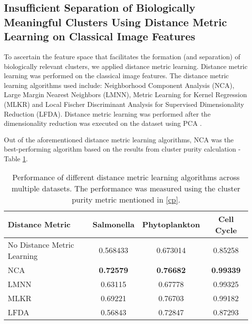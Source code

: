 \documentclass[12pt,a4paper]{article}
\begin{document}
\subsection{Insufficient Separation of Biologically Meaningful Clusters Using Distance Metric Learning on Classical Image Features}

To ascertain the feature space that facilitates the formation (and separation) of biologically relevant clusters, we applied distance metric learning. Distance metric learning was performed on the classical image features. The distance metric learning algorithms used include: Neighborhood Component Analysis (NCA), Large Margin Nearest Neighbors (LMNN), Metric Learning for Kernel Regression (MLKR) and Local Fischer Discriminant Analysis  for Supervised Dimensionality Reduction (LFDA).
Distance metric learning was performed after the dimensionality reduction was executed on the dataset using PCA \cite{pca}.

Out of the aforementioned distance metric learning algorithms, NCA was the best-performing algorithm based on the results from cluster purity calculation - Table \ref{tab:performanceofDML}.


\begin{table}[h]
\small
\centering
\caption{Performance of different distance metric learning algorithms across multiple datasets. The performance was measured using the cluster purity metric mentioned in \ref{cp}.}
\label{tab:performanceofDML}
\begin{tabular}{lccc}
\hline
\textbf{Distance Metric} & \textbf{Salmonella} & \textbf{Phytoplankton} & \textbf{Cell Cycle} \\
\hline
No Distance Metric Learning & 0.568433 & 0.673014 & 0.85258 \\
NCA & \textbf{0.72579} & \textbf{0.76682} & \textbf{0.99339} \\
LMNN & 0.63115 & 0.67778 & 0.99325 \\
MLKR & 0.69221 & 0.76703 & 0.99182 \\
LFDA & 0.56843 & 0.72847 & 0.87293 \\
\hline
\end{tabular}
\end{table}
\end{document}
